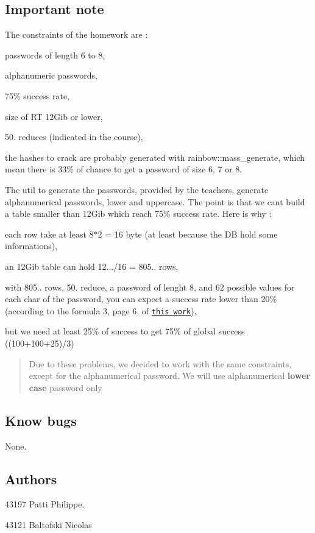 \subsection*{Important note}

The constraints of the homework are \+:
\begin{DoxyItemize}
\item passwords of length 6 to 8,
\item alphanumeric passwords,
\item 75\% success rate,
\item size of RT 12\+Gib or lower,
\item 50. reduces (indicated in the course),
\item the hashes to crack are probably generated with rainbow\+:\+:mass\+\_\+generate, which mean there is 33\% of chance to get a password of size 6, 7 or 8.
\end{DoxyItemize}

The util to generate the passwords, provided by the teachers, generate alphanumerical passwords, lower and uppercase. The point is that we can\textquotesingle{}t build a table smaller than 12\+Gib which reach 75\% success rate. Here is why \+:
\begin{DoxyItemize}
\item each row take at least 8$\ast$2 = 16 byte (at least because the DB hold some informations),
\item an 12\+Gib table can hold 12.../16 = 805.. rows,
\item with 805.. rows, 50. reduce, a password of lenght 8, and 62 possible values for each char of the password, you can expect a success rate lower than 20\% (according to the formula 3, page 6, of \href{https://lasecwww.epfl.ch/pub/lasec/doc/Oech03.pdf}{\tt this work}),
\item but we need at least 25\% of success to get 75\% of global success ({\ttfamily (100+100+25)/3})
\end{DoxyItemize}

\begin{quote}
Due to these problems, we decided to work with the same constraints, except for the alphanumerical password. We will use alphanumerical {\bfseries lower case} password only \end{quote}


\subsection*{Know bugs}

None.

\subsection*{Authors}

43197 Patti Philippe.

43121 Baltofski Nicolas 